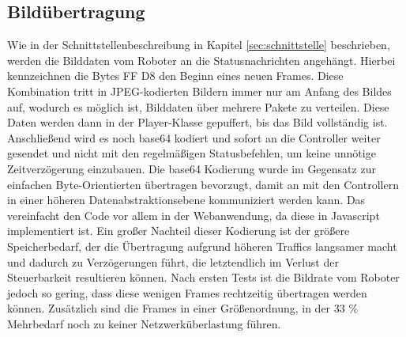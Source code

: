 \subsection{Bildübertragung}
Wie in der Schnittstellenbeschreibung in Kapitel \ref{sec:schnittstelle} beschrieben, werden die Bilddaten vom Roboter an die Statusnachrichten angehängt. Hierbei kennzeichnen die Bytes FF D8 den Beginn eines neuen Frames. Diese Kombination tritt in JPEG-kodierten Bildern immer nur am Anfang des Bildes auf, wodurch es möglich ist, Bilddaten über mehrere Pakete zu verteilen. Diese Daten werden dann in der Player-Klasse gepuffert, bis das Bild vollständig ist. Anschließend wird es noch base64 kodiert und sofort an die Controller weiter gesendet und nicht mit den regelmäßigen Statusbefehlen, um keine unnötige Zeitverzögerung einzubauen. Die base64 Kodierung wurde im Gegensatz zur einfachen Byte-Orientierten übertragen bevorzugt, damit an mit den Controllern in einer höheren Datenabstraktionsebene kommuniziert werden kann. Das vereinfacht den Code vor allem in der Webanwendung, da diese in Javascript implementiert ist. Ein großer Nachteil dieser Kodierung ist der größere Speicherbedarf, der die Übertragung aufgrund höheren Traffics langsamer macht und dadurch zu Verzögerungen führt, die letztendlich im Verlust der Steuerbarkeit resultieren können. Nach ersten Tests ist die Bildrate vom Roboter jedoch so gering, dass diese wenigen Frames rechtzeitig übertragen werden können. Zusätzlich sind die Frames in einer Größenordnung, in der 33 \% Mehrbedarf noch zu keiner Netzwerküberlastung führen.



